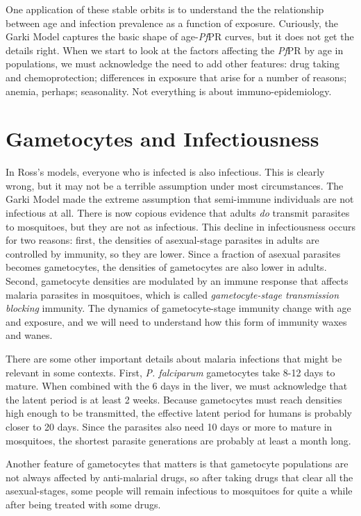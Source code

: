 \documentclass[
]{book}
\begin{document}
One application of these stable orbits is to understand the the relationship between age and infection prevalence as a function of exposure. Curiously, the Garki Model captures the basic shape of age-\emph{Pf}PR curves, but it does not get the details right. When we start to look at the factors affecting the \emph{Pf}PR by age in populations, we must acknowledge the need to add other features: drug taking and chemoprotection; differences in exposure that arise for a number of reasons; anemia, perhaps; seasonality. Not everything is about immuno-epidemiology.

\section{Gametocytes and Infectiousness}\label{gametocytes-and-infectiousness}

In Ross's models, everyone who is infected is also infectious. This is clearly wrong, but it may not be a terrible assumption under most circumstances. The Garki Model made the extreme assumption that semi-immune individuals are not infectious at all. There is now copious evidence that adults \emph{do} transmit parasites to mosquitoes, but they are not as infectious. This decline in infectiousness occurs for two reasons: first, the densities of asexual-stage parasites in adults are controlled by immunity, so they are lower. Since a fraction of asexual parasites becomes gametocytes, the densities of gametocytes are also lower in adults. Second, gametocyte densities are modulated by an immune response that affects malaria parasites in mosquitoes, which is called \emph{gametocyte-stage transmission blocking} immunity. The dynamics of gametocyte-stage immunity change with age and exposure, and we will need to understand how this form of immunity waxes and wanes.

There are some other important details about malaria infections that might be relevant in some contexts. First, \emph{P. falciparum} gametocytes take 8-12 days to mature. When combined with the 6 days in the liver, we must acknowledge that the latent period is at least 2 weeks. Because gametocytes must reach densities high enough to be transmitted, the effective latent period for humans is probably closer to 20 days. Since the parasites also need 10 days or more to mature in mosquitoes, the shortest parasite generations are probably at least a month long.

Another feature of gametocytes that matters is that gametocyte populations are not always affected by anti-malarial drugs, so after taking drugs that clear all the asexual-stages, some people will remain infectious to mosquitoes for quite a while after being treated with some drugs.
\end{document}
